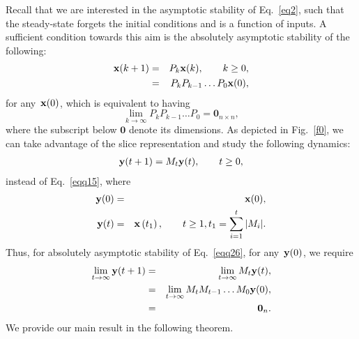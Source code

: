 \documentclass[draftclsnofoot, onecolumn, 12pt]{IEEEtran}
\def\mb{\mathbf}
\begin{document}
Recall that we are interested in the asymptotic stability of Eq.~\eqref{eq2}, such that the steady-state forgets the initial conditions and is a function of inputs. A sufficient condition towards this aim is the absolutely asymptotic stability of the following:
\begin{eqnarray}\label{eqq15}
{\bf{x}}(k+1)&=&{{P}_k}{\bf{x}}(k), \qquad k\geq0,\\
&=&{P}_{k} {P}_{k-1} \ldots {{P}_0}{\bf{x}}(0),\nonumber
\end{eqnarray}
for any~${\bf{x}}(0)$, which is equivalent to having 
\begin{equation}
\lim_{k \rightarrow \infty} {P}_{k} {P}_{k-1} \ldots {{P}_0}= \mb{0}_{n\times n},
\end{equation}
where the subscript below $\mb{0}$ denote its dimensions. As depicted in Fig.~\ref{f0}, we can take advantage of the slice representation and study the following dynamics:
\begin{eqnarray}\label{eqq26}\label{50}
{\bf{y}}(t+1)={{M}}_{t}{\bf{y}}(t), \qquad t \geq 0,
\end{eqnarray}
instead of Eq.~\eqref{eqq15}, where
\begin{eqnarray*}
{\bf{y}}(0)&=&{\bf{x}}(0),\\
{\bf{y}}(t)&=& {\bf{x}}\left(t_1\right), \qquad t\geq1, t_1=\sum\limits_{i=1}^{t}{\vert M_i \vert}.
\end{eqnarray*}
Thus, for absolutely asymptotic stability of Eq.~\eqref{eqq26}, for any~${\bf{y}}(0)$, we require
\begin{eqnarray}\label{49}
\lim_{t \rightarrow \infty}{\bf{y}}(t+1)&=&\lim_{t \rightarrow \infty} {{M}}_{t}{\bf{y}}(t),\\
&=& \lim_{t \rightarrow \infty}{{M}}_{t}{{M}}_{t-1} \ldots {{M}}_{0}{\bf{y}}(0),\nonumber\\
&=& \mb{0}_n.\nonumber
\end{eqnarray}
We provide our main result in the following theorem.
\end{document}
